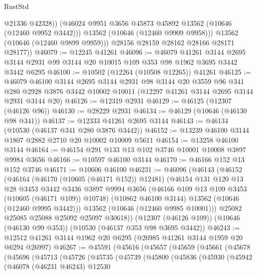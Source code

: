 \begin{lexlean}{RustStd}
\begin{coremodule}
                @21336
                @42328))
            (@46024 @9951 @3656 @45873 @45892 @13562 (@10646 (@12460 @9952 @3442)))
            @13562
            (@10646 (@12460 @9909 @9958)))
          @13562
          (@10646 (@12460 @9899 @9959)))
        @28156
        @28159
        @28162
        @28166
        @28171
        @28177))
@46079 := @12245 @41261
@46096 := @46079
    @41261
    @3144
    @2695
    @3144
    @2931
    @99
    @3144
    @20
    @10015
    @109
    @353
    @98
    @1962
    @3695
    @3442
    @3442
    @6295
@46100 := @10502 (@12264 (@10508 @12265)) @41261
@46125 := @46079
    @46100
    @3144
    @2695
    @3144
    @2931
    @98
    @3144
    @20
    @3559
    @96
    @341
    @280
    @2928
    @3876
    @3442
    @10002
    @10011
    (@12297 @41261 @3144 @2695 @3144 @2931 @3144 @20)
@46126 := @12319 @2931
@46129 := @46125 (@12307 (@46126 @96))
@46130 := @28229 @2931
@46134 := @46129 (@10646 (@46130 @98 @341))
@46137 := @12333 @41261 @2695 @3144
@46143 := @46134 (@10530 (@46137 @341 @280 @3876 @3442))
@46152 := @13239 @46100 @3144 @1807 @2882 @2710 @20 @10002 @10009 @5611
@46154 := @13258 @46100 @3144
@46164 := @46154 @291 @133 @13 @102 @3746 @10001 @10008 @3897 @9984 @3656
@46166 := @10597 @46100 @3144
@46170 := @46166 @152 @13 @152 @3746
@46171 := @10606 @46100
@46231 := @46096
    (@46143
      (@46152
        (@46164
          (@46170 (@10605 (@46171 @152)) @12481)
          (@46154
            @131
            @120
            @13
            @28
            @3453
            @3442
            @3436
            @3897
            @9994
            @3656
            (@46166 @109 @13 @109 @3453 (@10605 (@46171 @109)) @10748)
            (@10862 @46100 @3144)
            @13562
            (@10646 (@12460 @9995 @3442)))
          @13562
          (@10646 (@12460 @9985 @10001)))
        @25082
        @25085
        @25088
        @25092
        @25097
        @30618))
    (@12307 (@46126 @109))
    (@10646 (@46130 @99 @353))
    (@10530 (@46137 @353 @98 @3695 @3442))
@46243 := @12512 @41261 @3144 @1962 @20 @6295 (@26985 @41261 @3144 @1959 @20 @6294 @26997)
@46267 := @45591
    (@45616
      (@45657
        (@45659
          (@45661
            (@45678
              (@45696
                (@45713
                  (@45726
                    (@45735
                      (@45739
                        (@45800
                          (@45836
                            (@45930
                              (@45942
                                (@46078
                                  (@46231 @46243)
                                  @12530

\end{coremodule}
\end{lexlean}
